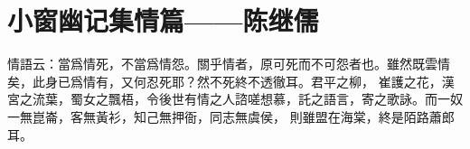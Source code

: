 \section{小窗幽记集情篇——陈继儒}

情語云：當爲情死，不當爲情怨。關乎情者，原可死而不可怨者也。雖然既雲情矣，此身已爲情有，又何忍死耶？然不死終不透徹耳。君平之柳，
崔護之花，漢宮之流葉，蜀女之飄梧，令後世有情之人諮嗟想慕，託之語言，寄之歌詠。而一奴一無崑崙，客無黃衫，知己無押衙，同志無虞侯，
則雖盟在海棠，終是陌路蕭郎耳。